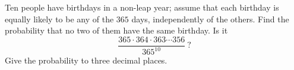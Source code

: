 Ten people have birthdays in a non-leap year; assume that each birthday is equally likely to be any of the $365$ days, independently of the others. Find the probability that no two of them have the same birthday. Is it
\[\dfrac{365\cdot364\cdot363\cdots356}{365^{10}}\ ?\]
Give the probability to three decimal places.
